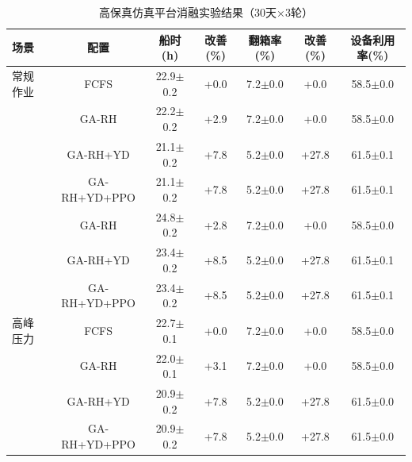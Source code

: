 \begin{table}[htbp]
\centering
\caption{高保真仿真平台消融实验结果（30天×3轮）}
\label{tab:simulation_ablation}
\begin{tabular}{lcccccc}
\toprule
场景 & 配置 & 船时(h) & 改善(\%) & 翻箱率(\%) & 改善(\%) & 设备利用率(\%) \\
\midrule
常规作业 & FCFS & 22.9$\pm$0.2 & +0.0 & 7.2$\pm$0.0 & +0.0 & 58.5$\pm$0.0 \\
 & GA-RH & 22.2$\pm$0.2 & +2.9 & 7.2$\pm$0.0 & +0.0 & 58.5$\pm$0.0 \\
 & GA-RH+YD & 21.1$\pm$0.2 & +7.8 & 5.2$\pm$0.0 & +27.8 & 61.5$\pm$0.1 \\
 & GA-RH+YD+PPO & 21.1$\pm$0.2 & +7.8 & 5.2$\pm$0.0 & +27.8 & 61.5$\pm$0.1 \\
\midrule
 & GA-RH & 24.8$\pm$0.2 & +2.8 & 7.2$\pm$0.0 & +0.0 & 58.5$\pm$0.0 \\
 & GA-RH+YD & 23.4$\pm$0.2 & +8.5 & 5.2$\pm$0.0 & +27.8 & 61.5$\pm$0.1 \\
 & GA-RH+YD+PPO & 23.4$\pm$0.2 & +8.5 & 5.2$\pm$0.0 & +27.8 & 61.5$\pm$0.1 \\
\midrule
高峰压力 & FCFS & 22.7$\pm$0.1 & +0.0 & 7.2$\pm$0.0 & +0.0 & 58.5$\pm$0.0 \\
 & GA-RH & 22.0$\pm$0.1 & +3.1 & 7.2$\pm$0.0 & +0.0 & 58.5$\pm$0.0 \\
 & GA-RH+YD & 20.9$\pm$0.2 & +7.8 & 5.2$\pm$0.0 & +27.8 & 61.5$\pm$0.0 \\
 & GA-RH+YD+PPO & 20.9$\pm$0.2 & +7.8 & 5.2$\pm$0.0 & +27.8 & 61.5$\pm$0.0 \\
\midrule
\bottomrule
\end{tabular}
\end{table}